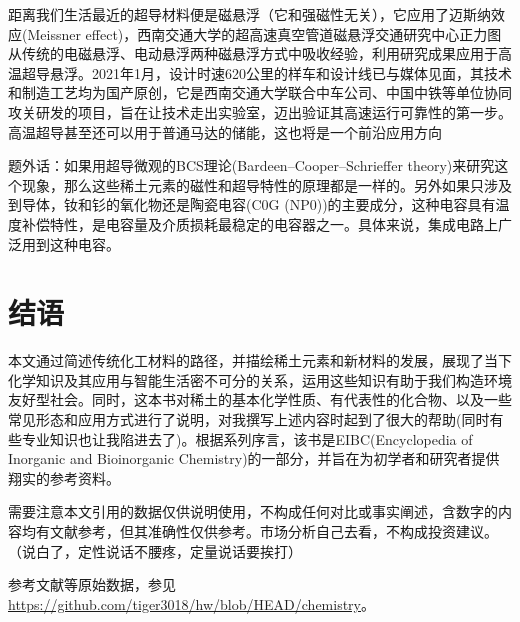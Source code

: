 距离我们生活最近的超导材料便是磁悬浮（它和强磁性无关），它应用了迈斯纳效应(Meissner effect)，西南交通大学的超高速真空管道磁悬浮交通研究中心正力图从传统的电磁悬浮、电动悬浮两种磁悬浮方式中吸收经验，利用研究成果应用于高温超导悬浮。2021年1月，设计时速620公里的样车和设计线已与媒体见面，其技术和制造工艺均为国产原创，它是西南交通大学联合中车公司、中国中铁等单位协同攻关研发的项目，旨在让技术走出实验室，迈出验证其高速运行可靠性的第一步。高温超导甚至还可以用于普通马达的储能，这也将是一个前沿应用方向\cite{AntonioJ.DossantosGarcia_2012a,王迪_2021}

题外话：如果用超导微观的BCS理论(Bardeen–Cooper–Schrieffer theory)来研究这个现象，那么这些稀土元素的磁性和超导特性的原理都是一样的。另外如果只涉及到导体，钕和钐的氧化物还是陶瓷电容(C0G (NP0))的主要成分，这种电容具有温度补偿特性，是电容量及介质损耗最稳定的电容器之一。具体来说，集成电路上广泛用到这种电容。\cite{Kaye_2020}

\section{结语}

本文通过简述传统化工材料的路径，并描绘稀土元素和新材料的发展，展现了当下化学知识及其应用与智能生活密不可分的关系，运用这些知识有助于我们构造环境友好型社会。同时，这本书对稀土的基本化学性质、有代表性的化合物、以及一些常见形态和应用方式进行了说明，对我撰写上述内容时起到了很大的帮助(同时有些专业知识也让我陷进去了)。根据系列序言，该书是EIBC(Encyclopedia of Inorganic and Bioinorganic Chemistry)的一部分，并旨在为初学者和研究者提供翔实的参考资料。

需要注意本文引用的数据仅供说明使用，不构成任何对比或事实阐述，含数字的内容均有文献参考，但其准确性仅供参考。市场分析自己去看，不构成投资建议。\cite{baipi_2012,Fernandez_2017}（说白了，定性说话不腰疼，定量说话要挨打）

参考文献等原始数据，参见\url{https://github.com/tiger3018/hw/blob/HEAD/chemistry}。